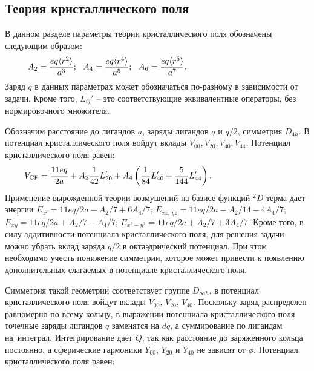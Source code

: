 \subsection{Теория кристаллического поля}
В данном разделе параметры теории кристаллического поля обозначены следующим образом:
\begin{equation*}
\begin{aligned}
& A_2 = \dfrac{eq \langle r^2 \rangle}{a^3};\,\,\,\, A_4 =\dfrac{eq \langle r^4 \rangle}{a^5};\,\,\,\, A_6 =\dfrac{eq \langle r^6 \rangle}{a^7}. \hspace{38mm}
\end{aligned}
\end{equation*}
Заряд $q$ в данных параметрах может обозначаться по-разному в зависимости от задачи. Кроме того, $L_{ij}'$ – это соответствующие эквивалентные операторы, без нормировочного множителя.\par
{} Обозначим расстояние до лигандов $a$, заряды лигандов $q$ и $q/2$, симметрия $D_{4h}$. В потенциал кристаллического поля войдут вклады $V_{00}\text{,}\,V_{20}\text{,}\,V_{40}\text{,}\,V_{44}$. Потенциал кристаллического поля равен:
\begin{equation*}
\begin{aligned}
& V_{\text{CF}}= \dfrac{11eq}{2a} + A_2 \dfrac{1}{42}L_{20}' + A_4 \left(\dfrac{ 1}{84}L_{40}'  + \dfrac{5 }{144}L_{44}'\right). \hspace{29mm}
\end{aligned}
\end{equation*}
Применение вырожденной теории возмущений на базисе функций $^2D$ терма дает энергии $E_{z^2} = 11eq/2a - A_2/7 + {6A_4}/{7}$; $E_{xz,\, yz} = 11eq/2a -{A_2}/{14} - {4A_4}/{7}$; $E_{xy} = 11eq/2a + {A_2}/{7} - {A_4}/{7}$; $E_{x^2-y^2} = 11eq/2a + {A_2}/{7} + {3A_4}/{7}$. Кроме того, в силу аддитивности потенциала кристаллического поля, для решения задачи можно убрать вклад заряда ${q}/{2}$ в октаэдрический потенциал. При этом необходимо учесть понижение симметрии, которое может привести к появлению дополнительных слагаемых в потенциале кристаллического поля.\par
{} Симметрия такой геометрии соответствует группе $D_{\infty h}$, в потенциал кристаллического поля войдут вклады $V_{00}$, $V_{20}$, $V_{40}$. Поскольку заряд распределен равномерно по всему кольцу, в выражении потенциала кристаллического поля точечные заряды лигандов $q$ заменятся на $dq$, а суммирование по лигандам на~интеграл. Интегрирование дает $Q$, так как расстояние до заряженного кольца постоянно, а сферические гармоники $\textit{Y}_{00}$, $\textit{Y}_{20}$ и $\textit{Y}_{40}$ не зависят от $\phi$. Потенциал кристаллического поля равен:
